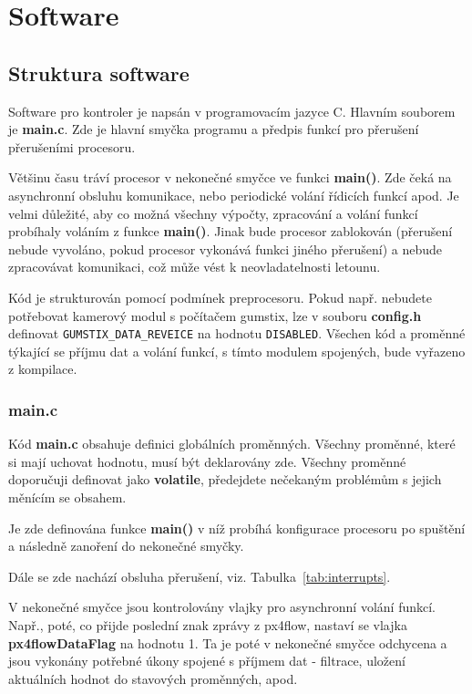 \documentclass[11pt, a4paper]{article}
\begin{document}
\newpage

\section{Software}

\subsection{Struktura software}

Software pro kontroler je napsán v programovacím jazyce C. Hlavním souborem je \textbf{main.c}. Zde je hlavní smyčka programu a předpis funkcí pro přerušení přerušeními procesoru.

Většinu času tráví procesor v nekonečné smyčce ve funkci \textbf{main()}. Zde čeká na asynchronní obsluhu komunikace, nebo periodické volání řídicích funkcí apod. Je velmi důležité, aby co možná všechny výpočty, zpracování a volání funkcí probíhaly voláním z funkce \textbf{main()}. Jinak bude procesor zablokován (přerušení nebude vyvoláno, pokud procesor vykonává funkci jiného přerušení) a nebude zpracovávat komunikaci, což může vést k neovladatelnosti letounu.

Kód je strukturován pomocí podmínek preprocesoru. Pokud např. nebudete potřebovat kamerový modul s počítačem gumstix, lze v souboru \textbf{config.h} definovat \texttt{GUMSTIX\_DATA\_REVEICE} na hodnotu \texttt{DISABLED}. Všechen kód a proměnné týkající se příjmu dat a volání funkcí, s tímto modulem spojených, bude vyřazeno z kompilace.

\subsubsection{main.c}

Kód \textbf{main.c} obsahuje definici globálních proměnných. Všechny proměnné, které si mají uchovat hodnotu, musí být deklarovány zde. Všechny proměnné doporučuji definovat jako \textbf{volatile}, předejdete nečekaným problémům s jejich měnícím se obsahem.

Je zde definována funkce \textbf{main()} v níž probíhá konfigurace procesoru po spuštění a následně zanoření do nekonečné smyčky.

Dále se zde nachází obsluha přerušení, viz. Tabulka~\ref{tab:interrupts}.

V nekonečné smyčce jsou kontrolovány vlajky pro asynchronní volání funkcí. Např., poté, co přijde poslední znak zprávy z px4flow, nastaví se vlajka \textbf{px4flowDataFlag} na hodnotu 1. Ta je poté v nekonečné smyčce odchycena a jsou vykonány potřebné úkony spojené s příjmem dat - filtrace, uložení aktuálních hodnot do stavových proměnných, apod.
\end{document}
